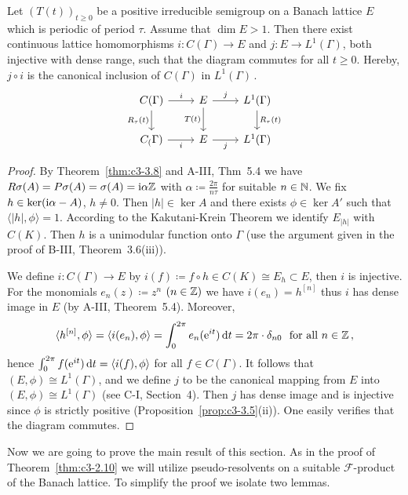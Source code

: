 \begin{corollary}\label{cor:c3-3.9}
	
	Let $(T(t))_{t\geq 0}$ be a positive irreducible semigroup on a Banach lattice $E$ which is periodic of period $\tau$.
	Assume that $\dim E > 1$.
	Then there exist continuous lattice homomorphisms
	$i \colon C(\Gamma) \to E$ and $j \colon E \to L^{1}(\Gamma)$,
	both injective with dense range,
	such that the diagram commutes for all $t\geq 0$.
	Hereby, $j\circ i$ is the canonical inclusion of $C(\Gamma)$ in $L^{1}(\Gamma)$\,.
	\[ 
	\begin{tikzcd}
		C(\Gamma) \arrow[r, "i"] \arrow[d, "R_\tau(t)"'] & E  \arrow[r, "j"] \arrow[d, "T(t)"'] & L^1(\Gamma) \arrow[d, "R_\tau(t)"] \\
		C_(\Gamma) \arrow[r, "i"'] & E \arrow[r, "j"'] & L^{1}(\Gamma)
	\end{tikzcd}
	\]
\end{corollary}
\begin{proof}
    By Theorem~\ref{thm:c3-3.8} and A-III, Thm~5.4 we have $R\sigma(A) = P\sigma(A) = \sigma(A) = \mathrm{i}\alpha\mathbb{Z}$ with $\alpha \coloneqq \frac{2\pi}{n\tau}$ for suitable $n \in \mathbb{N}$.
    We fix $h \in \ker(\mathrm{i}\alpha - A)$, $h \neq 0$.
    Then $|h| \in \ker A$ and there exists $\phi \in \ker A'$ such that $\langle|h|,\phi\rangle = 1$.
    According to the Kakutani-Krein Theorem we identify $E_{|h|}$ with $C(K)$.
    Then $h$ is a unimodular function onto $\Gamma$ (use the argument given in the proof of B-III, Theorem~3.6(iii)).
    
    We define $i \colon C(\Gamma) \to E$ by $i(f) \coloneqq f\circ h \in C(K) \cong E_{h} \subset E$, then $i$ is injective.
    For the monomials $e_{n}(z) \coloneqq z^{n}$ $(n \in \mathbb{Z})$ we have $i(e_{n}) = h^{[n]}$ thus $i$ has dense image in $E$ (by A-III, Theorem~5.4).
    Moreover, 
    \[
    \langle h^{[n]},\phi\rangle = \langle i(e_{n}),\phi\rangle = \int_{0}^{2\pi} e_{n}(\mathrm{e}^{it})\mathop{}\!\mathrm{d}{t}  =2\pi\cdot\delta_{n0}\  \text{ for all } n \in \mathbb{Z}\,,
    \] 
    hence $\int_{0}^{2\pi} f(\mathrm{e}^{it})\mathop{}\!\mathrm{d}{t}   = \langle i(f),\phi\rangle$ for all $f \in C(\Gamma)$.
    It follows that $(E,\phi) \cong L^{1}(\Gamma)$, and we define $j$ to be the canonical mapping from $E$ into $(E,\phi) \cong L^{1}(\Gamma)$ (see C-I, Section~4).
    Then $j$ has dense image and is injective since $\phi$ is strictly positive (\cf Proposition~\ref{prop:c3-3.5}(ii)).
    One easily verifies that the diagram commutes.
\end{proof}
Now we are going to prove the main result of this section.
As in the proof of Theorem~\ref{thm:c3-2.10} we will utilize pseudo-resolvents on a suitable $\mathcal{F}$-product of the Banach lattice.
To simplify the proof we isolate two lemmas.

